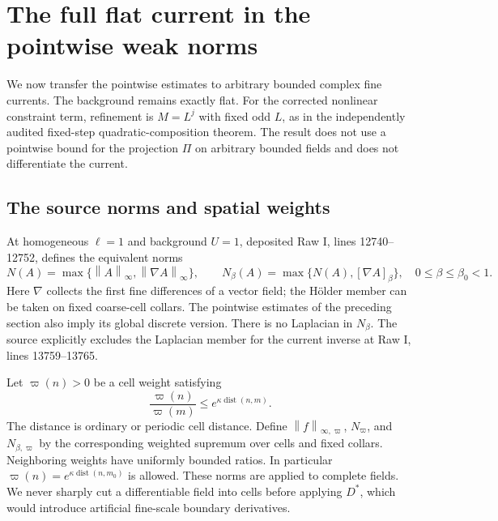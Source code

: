 \documentclass[11pt]{article}
\newcommand{\norm}[1]{\left\lVert#1\right\rVert}
\begin{document}
\section{The full flat current in the pointwise weak norms}
\label{pc-section}

We now transfer the pointwise estimates to arbitrary bounded complex
fine currents. The background remains exactly flat. For the corrected
nonlinear constraint term, refinement is $M=L^j$ with fixed odd $L$,
as in the independently audited fixed-step quadratic-composition
theorem. The result does not use a pointwise bound for the projection
$\Pi$ on arbitrary bounded fields and does not differentiate the current.

\subsection{The source norms and spatial weights}

At homogeneous $\ell=1$ and background $U=1$, deposited Raw I,
lines 12740--12752, defines the equivalent norms
\begin{equation}\label{pc-source-norms}
 N(A)=\max\{\norm{A}_\infty,\norm{\nabla A}_\infty\},\qquad
 N_\beta(A)=\max\{N(A),[\nabla A]_\beta\},
 \quad 0\le\beta\le\beta_0<1.
\end{equation}
Here $\nabla$ collects the first fine differences of a vector field;
the H\"older member can be taken on fixed coarse-cell collars.
The pointwise estimates of the preceding section also imply its
global discrete version. There is no Laplacian in $N_\beta$.
The source explicitly excludes the Laplacian member for the current
inverse at Raw I, lines 13759--13765.

Let $\varpi(n)>0$ be a cell weight satisfying
\begin{equation}\label{pc-weight-ratio}
 \frac{\varpi(n)}{\varpi(m)}
       \le e^{\kappa\operatorname{dist}(n,m)}.
\end{equation}
The distance is ordinary or periodic cell distance. Define
$\norm{f}_{\infty,\varpi}$, $N_\varpi$, and $N_{\beta,\varpi}$
by the corresponding weighted supremum over cells and fixed collars.
Neighboring weights have uniformly bounded ratios. In particular
$\varpi(n)=e^{\kappa\operatorname{dist}(n,m_0)}$ is allowed.
These norms are applied to complete fields. We never sharply cut a
differentiable field into cells before applying $D^*$, which would
introduce artificial fine-scale boundary derivatives.
\end{document}
